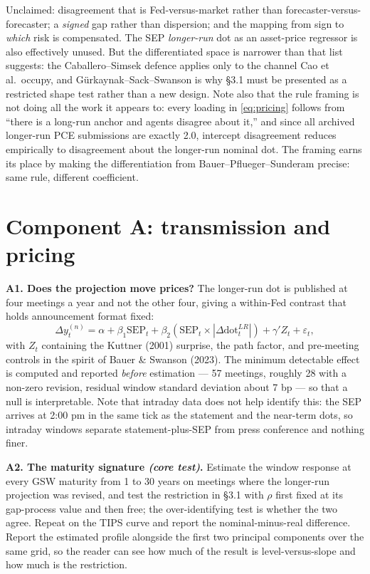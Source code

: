 \documentclass[11pt]{article}
\begin{document}
\vspace{0.3em}
\noindent Unclaimed: disagreement that is Fed-versus-market rather than
forecaster-versus-forecaster; a \emph{signed} gap rather than dispersion; and the mapping from
sign to \emph{which} risk is compensated. The SEP \emph{longer-run} dot as an asset-price
regressor is also effectively unused. But the differentiated space is narrower than that list
suggests: the Caballero--Simsek defence applies only to the channel Cao et al.\ occupy, and
Gürkaynak--Sack--Swanson is why \S3.1 must be presented as a restricted shape test rather than a
new design. Note also that the rule framing is not doing all the work it appears to: every
loading in \eqref{eq:pricing} follows from ``there is a long-run anchor and agents disagree about
it,'' and since all archived longer-run PCE submissions are exactly 2.0, intercept disagreement
reduces empirically to disagreement about the longer-run nominal dot. The framing earns its place
by making the differentiation from Bauer--Pflueger--Sunderam precise: same rule, different
coefficient.

\section{Component A: transmission and pricing}

\textbf{A1. Does the projection move prices?} The longer-run dot is published at four meetings a
year and not the other four, giving a within-Fed contrast that holds announcement format fixed:
\begin{equation}
\Delta y^{(n)}_t = \alpha + \beta_1 \text{SEP}_t + \beta_2 \left(\text{SEP}_t \times |\Delta \text{dot}^{LR}_t|\right) + \gamma' Z_t + \varepsilon_t ,
\label{eq:sep}
\end{equation}
with $Z_t$ containing the Kuttner (2001) surprise, the path factor, and pre-meeting controls in
the spirit of Bauer \& Swanson (2023). The minimum detectable effect is computed and reported
\emph{before} estimation --- 57 meetings, roughly 28 with a non-zero revision, residual window
standard deviation about 7 bp --- so that a null is interpretable. Note that intraday data does
not help identify this: the SEP arrives at 2:00 pm in the same tick as the statement and the
near-term dots, so intraday windows separate statement-plus-SEP from press conference and nothing
finer.

\textbf{A2. The maturity signature \emph{(core test)}.} Estimate the window response at every GSW
maturity from 1 to 30 years on meetings where the longer-run projection was revised, and test the
restriction in \S3.1 with $\rho$ first fixed at its gap-process value and then free; the
over-identifying test is whether the two agree. Repeat on the TIPS curve and report the
nominal-minus-real difference. Report the estimated profile alongside the first two principal
components over the same grid, so the reader can see how much of the result is level-versus-slope
and how much is the restriction.
\end{document}
